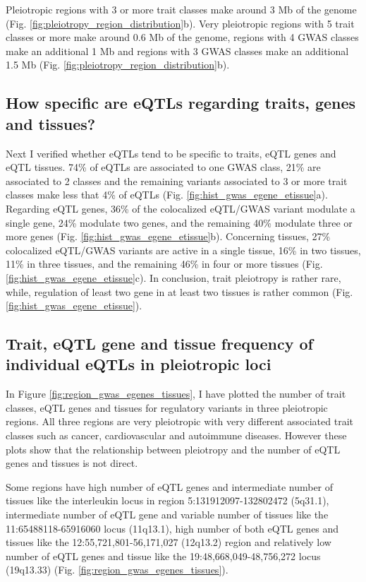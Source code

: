 Pleiotropic regions with 3 or more trait classes make around 3 Mb of the genome (Fig. \ref{fig:pleiotropy_region_distribution}b).
Very pleiotropic regions with 5 trait classes or more make around 0.6 Mb of the genome,
regions with 4 GWAS classes make an additional 1 Mb and regions with 3 GWAS classes make an additional 1.5 Mb (Fig. \ref{fig:pleiotropy_region_distribution}b).

\subsection*{How specific are eQTLs regarding traits, genes and tissues?}

Next I verified whether eQTLs tend to be specific to traits, eQTL genes and eQTL tissues.
%
74\% of eQTLs are associated to one GWAS class, 21\% are associated to 2 classes and the remaining variants associated to 3 or more trait classes make less that 4\% of eQTLs (Fig. \ref{fig:hist_gwas_egene_etissue}a).
%
Regarding eQTL genes, 36\% of the colocalized eQTL/GWAS variant modulate a single gene, 24\% modulate two genes, and the remaining 40\% modulate three or more genes (Fig. \ref{fig:hist_gwas_egene_etissue}b).
%
Concerning tissues, 27\% colocalized eQTL/GWAS variants are active in a single tissue, 16\% in two tissues, 11\% in three tissues, and the remaining 46\% in four or more tissues (Fig. \ref{fig:hist_gwas_egene_etissue}c).
%
In conclusion, trait pleiotropy is rather rare, while, regulation of least two gene in at least two tissues is rather common (Fig. \ref{fig:hist_gwas_egene_etissue}).

\subsection*{Trait, eQTL gene and tissue frequency of individual eQTLs in pleiotropic loci}

In Figure \ref{fig:region_gwas_egenes_tissues}, I have plotted the number of trait classes, eQTL genes and tissues for regulatory variants in three pleiotropic regions.
%
All three regions are very pleiotropic with very different associated trait classes such as cancer, cardiovascular and autoimmune diseases.
%
However these plots show that the relationship between pleiotropy and the number of eQTL genes and tissues is not direct.

Some regions have high number of eQTL genes and intermediate number of tissues like the interleukin locus in region 5:131912097-132802472 (5q31.1),
intermediate number of eQTL gene and variable number of tissues like the 11:65488118-65916060 locus (11q13.1),
high number of both eQTL genes and tissues like the 12:55,721,801-56,171,027 (12q13.2) region
and relatively low number of eQTL genes and tissue like the 19:48,668,049-48,756,272 locus (19q13.33) (Fig. \ref{fig:region_gwas_egenes_tissues}).

